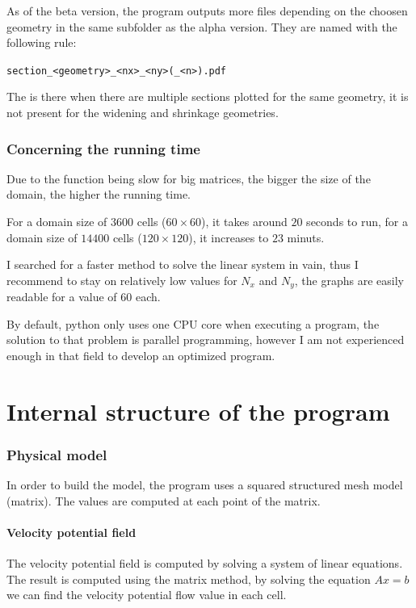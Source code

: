 As of the beta version, the program outputs more files depending on the choosen
geometry in the same subfolder as the alpha version. They are named with the
following rule:
\begin{center}
      \texttt{section_<geometry>_<nx>_<ny>(_<n>).pdf}
\end{center}
The  is there when there are multiple sections plotted for the same
geometry, it is not present for the widening and shrinkage geometries.
\section{Concerning the running time}
Due to the function  being slow for
big matrices, the bigger the size of the domain, the higher the running time.

For a domain size of $\num{3600}$ cells ($\num{60} \times \num{60}$), it takes
around $\num{20}$ seconds to run, for a domain size of $\num{14400}$ cells
($\num{120} \times \num{120}$), it increases to $\num{23}$ minuts. 

I searched for a faster method to solve the linear system in vain, thus I
recommend to stay on relatively low values for $N_x$ and $N_y$, the graphs are
easily readable for a value of $\num{60}$ each.

By default, python only uses one CPU core when executing a program, the
solution to that problem is parallel programming, however I am not experienced
enough in that field to develop an optimized program.

\newpage
\part{Internal structure of the program}
\section{Physical model}
In order to build the model, the program uses a squared structured mesh
model (matrix). The values are computed at each point of the matrix.

\subsection{Velocity potential field}
The velocity potential field is computed by solving a system of linear
equations. The result is computed using the matrix method, by solving the
equation $Ax = b$ we can find the velocity potential flow value in each cell.

